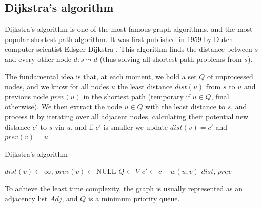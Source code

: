 \subsection{Dijkstra's algorithm} \label{algorithm-shortestpath-dijkstra}
Dijkstra's algorithm is one of the most famous graph algorithms, and the most popular shortest path algorithm. It was first published in 1959 by Dutch computer scientist Edsger Dijkstra \cite{dijkstra}. This algorithm finds the distance between $s$ and every other node $d \colon s \leadsto d$ (thus solving all shortest path problems from $s$).\par
The fundamental idea is that, at each moment, we hold a set $Q$ of unprocessed nodes, and we know for all nodes $u$ the least distance $dist(u)$ from $s$ to $u$ and previous node $prev(u)$ in the shortest path (temporary if $u \in Q$, final otherwise). We then extract the node $u \in Q$ with the least distance to $s$, and process it by iterating over all adjacent nodes, calculating their potential new distance $c'$ to $s$ via $u$, and if $c'$ is smaller we update $dist(v)=c'$ and $prev(v)=u$.\par
\begin{algorithm}[h]
    \caption{Dijkstra's algorithm}
    \label{alg-dijkstra}
    \begin{algorithmic}[1]
                {$dist(v) \gets \infty$, $prev(v) \gets \text{NULL}$} 
            \EndFor
            \State $Q \gets V$
             
                    \State $c' \gets c + w(u, v)$
                    \EndIf
                \EndFor
            \EndWhile
            \State \Return $dist$, $prev$
        \EndFunction
    \end{algorithmic}
\end{algorithm}
To achieve the least time complexity, the graph is usually represented as an adjacency list $Adj$, and $Q$ is a minimum priority queue.
